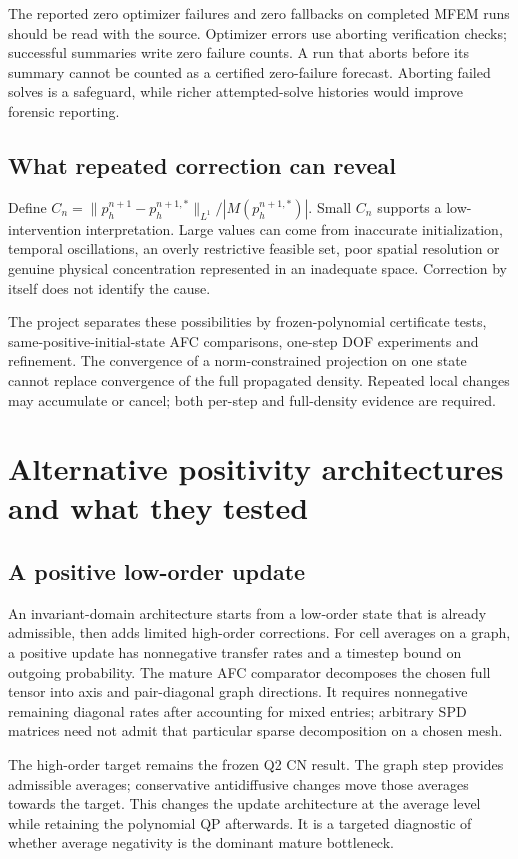 The reported zero optimizer failures and zero fallbacks on completed MFEM runs should be read with the source. Optimizer errors use aborting verification checks; successful summaries write zero failure counts. A run that aborts before its summary cannot be counted as a certified zero-failure forecast. Aborting failed solves is a safeguard, while richer attempted-solve histories would improve forensic reporting.

\section{What repeated correction can reveal}
Define $C_n=\|p_h^{n+1}-p_h^{n+1,*}\|_{L^1}/|M(p_h^{n+1,*})|$. Small $C_n$ supports a low-intervention interpretation. Large values can come from inaccurate initialization, temporal oscillations, an overly restrictive feasible set, poor spatial resolution or genuine physical concentration represented in an inadequate space. Correction by itself does not identify the cause.

The project separates these possibilities by frozen-polynomial certificate tests, same-positive-initial-state AFC comparisons, one-step DOF experiments and refinement. The convergence of a norm-constrained projection on one state cannot replace convergence of the full propagated density. Repeated local changes may accumulate or cancel; both per-step and full-density evidence are required.

\chapter{Alternative positivity architectures and what they tested}\label{ch:afc}
\section{A positive low-order update}
An invariant-domain architecture starts from a low-order state that is already admissible, then adds limited high-order corrections. For cell averages on a graph, a positive update has nonnegative transfer rates and a timestep bound on outgoing probability. The mature AFC comparator decomposes the chosen full tensor into axis and pair-diagonal graph directions. It requires nonnegative remaining diagonal rates after accounting for mixed entries; arbitrary SPD matrices need not admit that particular sparse decomposition on a chosen mesh.

The high-order target remains the frozen Q2 CN result. The graph step provides admissible averages; conservative antidiffusive changes move those averages towards the target. This changes the update architecture at the average level while retaining the polynomial QP afterwards. It is a targeted diagnostic of whether average negativity is the dominant mature bottleneck.

